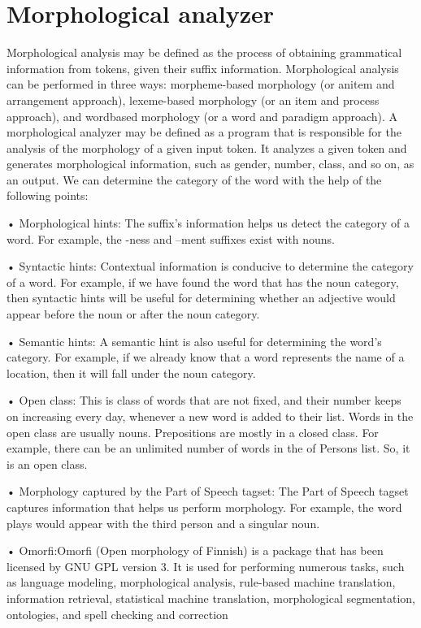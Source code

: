 \documentclass[11pt]{article}
\begin{document}
    \hypertarget{morphological-analyzer}{%
\section{Morphological analyzer}\label{morphological-analyzer}}

    Morphological analysis may be defined as the process of obtaining
grammatical information from tokens, given their suffix information.
Morphological analysis can be performed in three ways: morpheme-based
morphology (or anitem and arrangement approach), lexeme-based morphology
(or an item and process approach), and wordbased morphology (or a word
and paradigm approach). A morphological analyzer may be defined as a
program that is responsible for the analysis of the morphology of a
given input token. It analyzes a given token and generates morphological
information, such as gender, number, class, and so on, as an output.
We can determine the category of the word with the help of the following points:

• Morphological hints: The suffix's information helps us detect the category
of a word. For example, the -ness and –ment suffixes exist with nouns.

• Syntactic hints: Contextual information is conducive to determine the
category of a word. For example, if we have found the word that has the
noun category, then syntactic hints will be useful for determining whether
an adjective would appear before the noun or after the noun category.

• Semantic hints: A semantic hint is also useful for determining the word's
category. For example, if we already know that a word represents the name
of a location, then it will fall under the noun category.

• Open class: This is class of words that are not fixed, and their number keeps
on increasing every day, whenever a new word is added to their list. Words
in the open class are usually nouns. Prepositions are mostly in a closed class.
For example, there can be an unlimited number of words in the of Persons
list. So, it is an open class.

• Morphology captured by the Part of Speech tagset: The Part of Speech
tagset captures information that helps us perform morphology. For example,
the word plays would appear with the third person and a singular noun.

• Omorfi:Omorfi (Open morphology of Finnish) is a package that has
been licensed by GNU GPL version 3. It is used for performing numerous
tasks, such as language modeling, morphological analysis, rule-based
machine translation, information retrieval, statistical machine translation,
morphological segmentation, ontologies, and spell checking and correction
\end{document}
